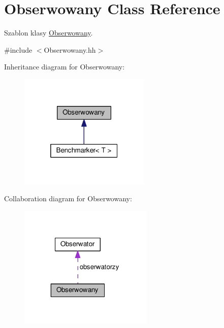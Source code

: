 \hypertarget{a00017}{}\section{Obserwowany Class Reference}
\label{a00017}


Szablon klasy \hyperlink{a00017}{Obserwowany}.  




{\ttfamily \#include $<$Obserwowany.\+hh$>$}



Inheritance diagram for Obserwowany\+:
\nopagebreak
\begin{figure}[H]
\begin{center}
\leavevmode
\includegraphics[width=176pt]{a00162}
\end{center}
\end{figure}


Collaboration diagram for Obserwowany\+:
\nopagebreak
\begin{figure}[H]
\begin{center}
\leavevmode
\includegraphics[width=181pt]{a00163}
\end{center}
\end{figure}
